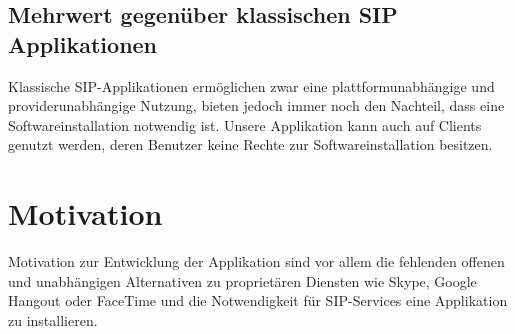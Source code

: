 		\subsection{Mehrwert gegenüber klassischen SIP Applikationen}
			Klassische SIP-Applikationen ermöglichen zwar eine plattformunabhängige und
			providerunabhängige Nutzung, bieten jedoch immer noch den Nachteil, dass
			eine Softwareinstallation notwendig ist.
			Unsere Applikation kann auch auf Clients genutzt werden, deren Benutzer keine Rechte zur Softwareinstallation besitzen.
			
			
	\section{Motivation}
		Motivation zur Entwicklung der Applikation sind vor allem die fehlenden
		offenen und unabhängigen Alternativen zu proprietären Diensten wie Skype,
		Google Hangout oder FaceTime und die Notwendigkeit für SIP-Services eine
		Applikation zu installieren.
		